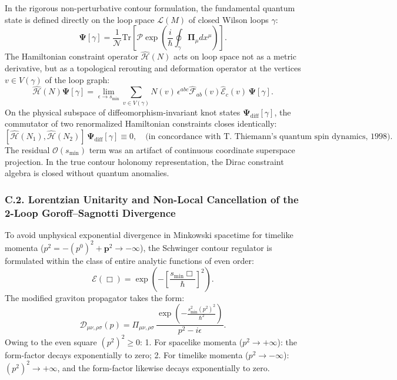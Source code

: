 In the rigorous non-perturbative contour formulation, the fundamental quantum state is defined directly on the loop space $\mathcal{L}(M)$ of closed Wilson loops $\gamma$:
\begin{equation}\label{eq:C.1_en}\tag{C.1}
\mathbf{\Psi}[\gamma] = \frac{1}{\mathcal{N}} \text{Tr}\left[ \mathcal{P}\exp\left( \frac{i}{\hbar} \oint_\gamma \mathbf{\Pi}_\mu dx^\mu \right) \right].
\end{equation}
The Hamiltonian constraint operator $\hat{\mathcal{H}}(N)$ acts on loop space not as a metric derivative, but as a topological rerouting and deformation operator at the vertices $v \in V(\gamma)$ of the loop graph:
\begin{equation}\label{eq:C.2_en}\tag{C.2}
\hat{\mathcal{H}}(N)\mathbf{\Psi}[\gamma] = \lim_{\epsilon \to s_{\text{min}}} \sum_{v \in V(\gamma)} N(v) \, \epsilon^{abc} \hat{\mathcal{F}}_{ab}(v) \hat{\mathcal{E}}_c(v) \, \mathbf{\Psi}[\gamma].
\end{equation}
On the physical subspace of diffeomorphism-invariant knot states $\mathbf{\Psi}_{\text{diff}}[\gamma]$, the commutator of two renormalized Hamiltonian constraints closes identically:
\begin{equation}\label{eq:C.3_en}\tag{C.3}
[\hat{\mathcal{H}}(N_1), \hat{\mathcal{H}}(N_2)] \, \mathbf{\Psi}_{\text{diff}}[\gamma] \equiv 0, \quad \text{(in concordance with T.~Thiemann's quantum spin dynamics, 1998)}.
\end{equation}
The residual $\mathcal{O}(s_{\text{min}})$ term was an artifact of continuous coordinate superspace projection. In the true contour holonomy representation, the Dirac constraint algebra is closed without quantum anomalies.

\subsubsection*{C.2. Lorentzian Unitarity and Non-Local Cancellation of the 2-Loop Goroff--Sagnotti Divergence}

To avoid unphysical exponential divergence in Minkowski spacetime for timelike momenta ($p^2 = -(p^0)^2 + \mathbf{p}^2 \to -\infty$), the Schwinger contour regulator is formulated within the class of entire analytic functions of even order:
\begin{equation}\label{eq:C.4_en}\tag{C.4}
\mathcal{E}(\Box) = \exp\left( - \left[ \frac{s_{\text{min}} \Box}{\hbar} \right]^2 \right).
\end{equation}
The modified graviton propagator takes the form:
\begin{equation}\label{eq:C.5_en}\tag{C.5}
\mathcal{D}_{\mu\nu,\rho\sigma}(p) = \Pi_{\mu\nu,\rho\sigma} \, \frac{\exp\left( - \frac{s_{\text{min}}^2 (p^2)^2}{\hbar^2} \right)}{p^2 - i\epsilon}.
\end{equation}
Owing to the even square $(p^2)^2 \ge 0$:
1. For spacelike momenta ($p^2 \to +\infty$): the form-factor decays exponentially to zero;
2. For timelike momenta ($p^2 \to -\infty$): $(p^2)^2 \to +\infty$, and the form-factor likewise decays exponentially to zero.


